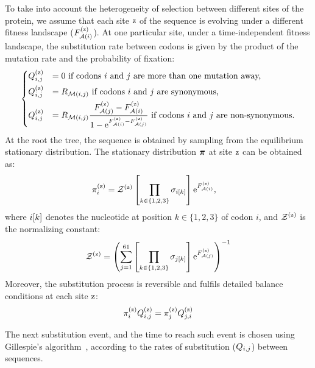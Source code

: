 To take into account the heterogeneity of selection between different sites of the protein, we assume that each site $\text{z}$ of the sequence is evolving under a different fitness landscape ($F_{\mathcal{A}({i})}^{(\text{z})}$).
At one particular site, under a time-independent fitness landscape, the substitution rate between codons is given by the product of the mutation rate and the probability of fixation:
\begin{equation}
    \begin{dcases}
        Q_{{i}, {j}}^{(\text{z})} & = 0 \text{ if codons ${i}$ and ${j}$ are more than one mutation away,}\\
        Q_{{i}, {j}}^{(\text{z})} & = R_{\mathcal{M}({i}, {j})} \text{ if codons ${i}$ and ${j}$ are synonymous,} \\
        Q_{{i}, {j}}^{(\text{z})} & = R_{\mathcal{M}({i}, {j})} \dfrac{F_{\mathcal{A}({j})}^{(\text{z})} - F_{\mathcal{A}({i})}^{(\text{z})}}{1 - \text{e}^{F_{\mathcal{A}({i})}^{(\text{z})} - F_{\mathcal{A}({j})}^{(\text{z})}} } \text{ if codons ${i}$ and ${j}$ are non-synonymous}.
    \end{dcases}
    \label{eq:codonsubrates}
\end{equation}
At the root the tree, the sequence is obtained by sampling from the equilibrium stationary distribution.
The stationary distribution $\bm{\pi}$ at site $\text{z}$ can be obtained as:
\begin{align}
    \pi_{{i}}^{(\text{z})} & = \mathcal{Z}^{(\text{z})} \left[\prod\limits_{k \in \{ 1, 2, 3 \}} \sigma_{{i}[k]}\right] \text{e}^{F_{\mathcal{A}({i})}^{(\text{z})}},
    \label{codonStationarity}
\end{align}
where ${i}[k]$ denotes the nucleotide at position $k \in \{ 1, 2, 3 \}$ of codon $i$, and $\mathcal{Z}^{(\text{z})} $ is the normalizing constant:
\begin{align}
    \mathcal{Z}^{(\text{z})} = \left( \sum\limits_{{j}=1}^{61} \left[\prod\limits_{k \in \{ 1, 2, 3 \}} \sigma_{{j}[k]}\right] \text{e}^{F_{\mathcal{A}({j})}^{(\text{z})}} \right)^{-1}
\end{align}
Moreover, the substitution process is reversible and fulfils detailed balance conditions at each site $\text{z}$:
\begin{align}
    \pi_{{i}}^{(\text{z})} Q_{{i}, {j}}^{(\text{z})} = \pi_{{j}}^{(\text{z})} Q_{{j}, {i}}^{(\text{z})}
    \label{codonSubBalance}
\end{align}

The next substitution event, and the time to reach such event is chosen using Gillespie's algorithm~\citep{Gillespie1977}, according to the rates of substitution ($Q_{{i}, {j}}$) between sequences.

